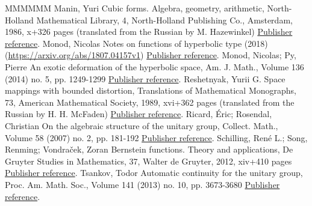 \documentclass[11pt]{article}
\theoremstyle{definition}
\numberwithin{equation}{section}
\numberwithin{figure}{section}
\numberwithin{table}{section}
\begin{document}
\begin{thebibliography}{MMMMMM}
 Manin, Yuri Cubic forms. Algebra, geometry, arithmetic, North-Holland Mathematical Library, 4, North-Holland Publishing Co., Amsterdam, 1986, x+326 pages (translated from the Russian by M. Hazewinkel) \href{https://ahl.centre-mersenne.org/item/AHL_2019__2__259_0/#Manin}{Publisher reference}.
 Monod, Nicolas Notes on functions of hyperbolic type (2018) (\url{https://arxiv.org/abs/1807.04157v1}) \href{https://ahl.centre-mersenne.org/item/AHL_2019__2__259_0/#MonodFHT_arx}{Publisher reference}.
 Monod, Nicolas; Py, Pierre An exotic deformation of the hyperbolic space, Am. J. Math., Volume 136 (2014) no. 5, pp. 1249-1299 \href{https://ahl.centre-mersenne.org/item/AHL_2019__2__259_0/#Monod-Py}{Publisher reference}.
 Reshetnyak, Yurii G. Space mappings with bounded distortion, Translations of Mathematical Monographs, 73, American Mathematical Society, 1989, xvi+362 pages (translated from the Russian by H. H. McFaden) \href{https://ahl.centre-mersenne.org/item/AHL_2019__2__259_0/#Reshetnyak}{Publisher reference}.
 Ricard, Éric; Rosendal, Christian On the algebraic structure of the unitary group, Collect. Math., Volume 58 (2007) no. 2, pp. 181-192 \href{https://ahl.centre-mersenne.org/item/AHL_2019__2__259_0/#Ricard-Rosendal}{Publisher reference}.
 Schilling, René L.; Song, Renming; Vondraček, Zoran Bernstein functions. Theory and applications, De Gruyter Studies in Mathematics, 37, Walter de Gruyter, 2012, xiv+410 pages \href{https://ahl.centre-mersenne.org/item/AHL_2019__2__259_0/#Schilling-Song-Vondracek_2}{Publisher reference}.
 Tsankov, Todor Automatic continuity for the unitary group, Proc. Am. Math. Soc., Volume 141 (2013) no. 10, pp. 3673-3680 \href{https://ahl.centre-mersenne.org/item/AHL_2019__2__259_0/#Tsankov13}{Publisher reference}.
\end{thebibliography}
\end{document}
